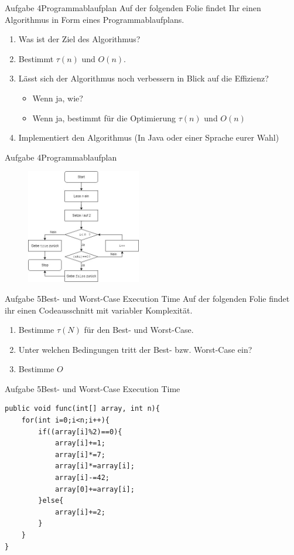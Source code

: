 \begin{frame}{Aufgabe 4}{Programmablaufplan}
Auf der folgenden Folie findet Ihr einen Algorithmus in Form eines Programmablaufplans. 
\begin{enumerate}
    \item Was ist der Ziel des Algorithmus?
    \item Bestimmt $\tau(n)$ und $O(n)$.
    \item Lässt sich der Algorithmus noch verbessern in Blick auf die Effizienz?
    \begin{itemize}
        \item Wenn ja, wie?
        \item Wenn ja, bestimmt für die Optimierung $\tau(n)$ und $O(n)$
    \end{itemize}
    \item Implementiert den Algorithmus (In Java oder einer Sprache eurer Wahl)
\end{enumerate}
\end{frame}

\begin{frame}{Aufgabe 4}{Programmablaufplan}
\begin{figure}
    \includegraphics[height=5cm]{graph/pap_excercise_algo}
\end{figure}
\end{frame}

\begin{frame}{Aufgabe 5}{Best- und Worst-Case Execution Time}
Auf der folgenden Folie findet ihr einen Codeausschnitt mit variabler Komplexität.

\begin{enumerate}
    \item Bestimme $\tau(N)$ für den Best- und Worst-Case.
    \item Unter welchen Bedingungen tritt der Best- bzw. Worst-Case ein?
    \item Bestimme $O$
\end{enumerate}
\end{frame}

\begin{frame}[fragile]{Aufgabe 5}{Best- und Worst-Case Execution Time}
\lstset{style=java}
\begin{lstlisting}
public void func(int[] array, int n){
    for(int i=0;i<n;i++){
        if((array[i]%2)==0){
            array[i]+=1;
            array[i]*=7;
            array[i]*=array[i];
            array[i]-=42;
            array[0]+=array[i];
        }else{
            array[i]+=2;
        }
    }
}
\end{lstlisting}
\end{frame}